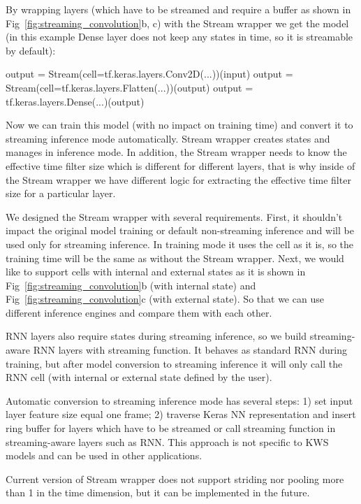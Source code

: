 \documentclass[a4paper]{article}
\begin{document}
\noindent By wrapping layers (which have to be streamed and require a buffer as shown in Fig~\ref{fig:streaming_convolution}b, c) with the Stream wrapper we get the model (in this example Dense layer does not keep any states in time, so it is streamable by default):

\begin{verbnobox}[\fontsize{7pt}{7pt}\selectfont]
output = Stream(cell=tf.keras.layers.Conv2D(...))(input)
output = Stream(cell=tf.keras.layers.Flatten(...))(output)
output = tf.keras.layers.Dense(...)(output)
\end{verbnobox}

\noindent Now we can train this model (with no impact on training time) and convert it to streaming inference mode automatically.
Stream wrapper creates states and manages in inference mode. In addition, the Stream wrapper needs to know the effective time filter size which is different for different layers, that is why inside of the Stream wrapper we have different logic for extracting the effective time filter size for a particular layer.

We designed the Stream wrapper with several requirements. First, it shouldn't impact the original model training or default non-streaming inference and will be used only for streaming inference. In training mode it uses the cell as it is, so the training time will be the same as without the Stream wrapper. Next, we would like to support cells with internal and external states as it is shown in Fig~\ref{fig:streaming_convolution}b (with internal state) and Fig~\ref{fig:streaming_convolution}c (with external state). So that we can use different inference engines and compare them with each other.

RNN layers also require states during streaming inference, so we build streaming-aware RNN layers with streaming function. It behaves as standard RNN during training, but after model conversion to streaming inference it will only call the RNN cell (with internal or external state defined by the user).

Automatic conversion to streaming inference mode has several steps: 1) set input layer feature size equal one frame; 2) traverse Keras NN representation and insert ring buffer for layers which have to be streamed or call streaming function in streaming-aware layers such as RNN. This approach is not specific to KWS models and can be used in other applications.

Current version of Stream wrapper does not support striding nor pooling more than 1 in the time dimension, but it can be implemented in the future.
\end{document}
